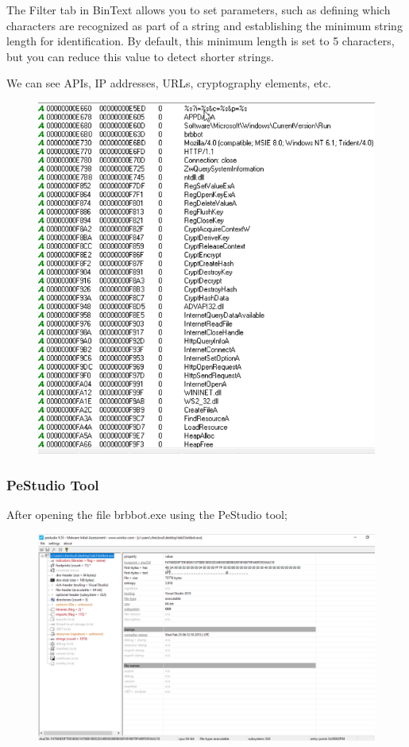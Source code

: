 \documentclass[]{project_plan}
\begin{document}
The Filter tab in BinText allows you to set parameters, such as defining
which characters are recognized as part of a string and establishing the minimum
string length for identification. By default, this minimum length is set to 5
characters, but you can reduce this value to detect shorter strings.

We can see APIs, IP addresses, URLs, cryptography elements, etc.

\begin{figure}[H]
  \centering
  \includegraphics[width=.5\linewidth]{lab3 bintext 2.png}
\end{figure}

\subsubsection{PeStudio Tool}

After opening the file brbbot.exe using the PeStudio tool;
\begin{figure}[H]
  \centering
  \includegraphics[width=\linewidth]{lab3 pestudio.png}
\end{figure}
\end{document}
